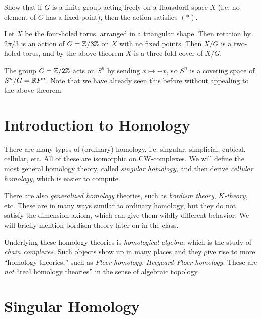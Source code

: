 \begin{exercise}
  Show that if $G$ is a finite group acting freely on a
  Hausdorff space $X$ (i.e. no element of $G$ has a
  fixed point), then the action satisfies $(*)$.
\end{exercise}

\begin{example}
  Let $X$ be the four-holed torus, arranged in a
  triangular shape. Then rotation by $2\pi / 3$
  is an action of $G = \mathbb{Z} / 3\mathbb{Z}$ on $X$ with no fixed
  points. Then $X / G$ is a two-holed torus, and
  by the above theorem
  $X$ is a three-fold cover of $X / G$.
\end{example}

\begin{example}
  The group $G = \mathbb{Z} / 2\mathbb{Z}$ acts on $S^n$ by sending
  $x \mapsto -x$, so $S^n$ is a covering space
  of $S^n / G = \mathbb{R} P^n$. Note that we have already
  seen this before without appealing to the above
  theorem.
\end{example}

\section{Introduction to Homology}

\begin{remark}
  There are many types of (ordinary) homology, i.e.
  singular, simplicial, cubical, cellular, etc.
  All of these are isomorphic on CW-complexes.
  We will define the most general homology theory,
  called \emph{singular homology}, and then derive
  \emph{cellular homology}, which is easier to compute.
  
  There are also \emph{generalized homology} theories,
  such as \emph{bordism theory}, \emph{$K$-theory}, etc.
  These are in many ways similar to ordinary homology,
  but they do not satisfy the dimension axiom, which
  can give them wildly different behavior. We will
  briefly mention bordism theory later on in the class.

  Underlying these homology theories is
  \emph{homological algebra}, which is the study of
  \emph{chain complexes}. Such objects show up in
  many places and they give rise to
  more ``homology theories,'' such as
  \emph{Floer homology}, \emph{Heegaard-Floer homology}.
  These are \emph{not} ``real homology theories''
  in the sense of algebraic topology.
\end{remark}

\section{Singular Homology}

